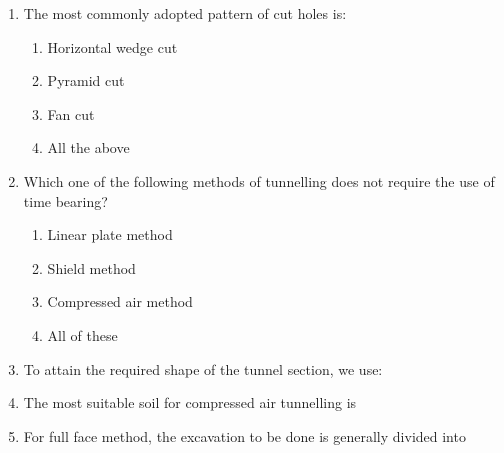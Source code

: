 \documentclass[11pt,a4paper]{article}
\begin{document}
\begin{enumerate}
\begin{enumerate}[label=\Alph*.]
\end{enumerate}
\item{The most commonly adopted pattern of cut holes is:}
\begin{enumerate}[label=\Alph*.]
\item{Horizontal wedge cut}
\item{Pyramid cut}
\item{Fan cut}
\item{All the above}
\end{enumerate}
\item{Which one of the following methods of tunnelling does not require the use of time bearing?}
\begin{enumerate}[label=\Alph*.]
\item{Linear plate method}
\item{Shield method}
\item{Compressed air method}
\item{All of these}
\end{enumerate}
\item{To attain the required shape of the tunnel section, we use:}
\\
\item{The most suitable soil for compressed air tunnelling is}
\\
\item{For full face method, the excavation to be done is generally divided into}
\\

\end{enumerate}
\end{document}
